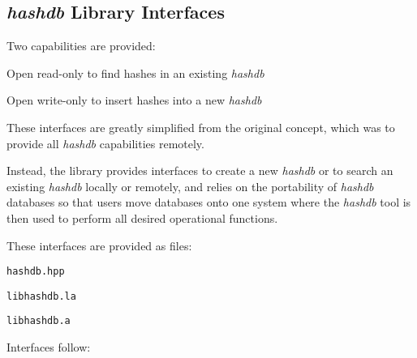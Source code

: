 \documentclass[12pt,twoside]{article}
\newcommand{\hdb}{\emph{hashdb}\xspace}
\begin{document}
\subsection{\hdb Library Interfaces}
Two capabilities are provided:
\begin{compactitem}
\item Open read-only to find hashes in an existing \hdb
\item Open write-only to insert hashes into a new \hdb
\end{compactitem}

These interfaces are greatly simplified from the original concept,
which was to provide all \hdb capabilities remotely.

Instead, the library provides interfaces to create a new \hdb
or to search an existing \hdb locally or remotely,
and relies on the portability of \hdb databases
so that users move databases onto one system
where the \hdb tool is then used
to perform all desired operational functions.

These interfaces are provided as files:
\begin{compactitem}
\item \texttt{hashdb.hpp}
\item \texttt{libhashdb.la}
\item \texttt{libhashdb.a}
\end{compactitem}

Interfaces follow:
\end{document}
